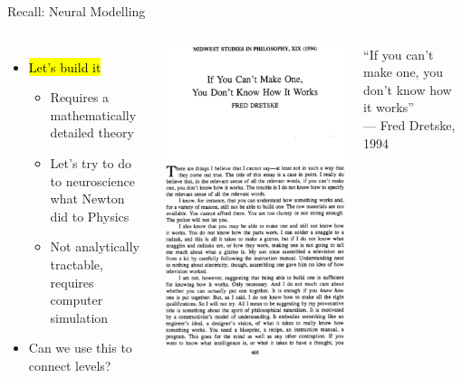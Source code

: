 \documentclass[handout,aspectratio=169]{beamer}
\begin{document}
\begin{frame}{Recall: Neural Modelling}
	\begin{overlayarea}{\textwidth}{7cm}
		\begin{columns}[c]
			\begin{itemize}
				\setlength\itemsep{0.25cm}
				\item \hl{Let's build it}\\[0.125cm]
				\begin{itemize}
					\setlength\itemsep{0.25cm}
					\item Requires a mathematically detailed theory
					\item Let's try to do to neuroscience what Newton did to Physics
					\item Not analytically tractable, requires computer simulation
				\end{itemize}
				\item Can we use this to connect levels?
			\end{itemize}
			\centering
			\includegraphics[width=0.5\columnwidth]{media/dretske_make_one.png}
			\begin{center}
				\color{aluminium4}
				\quotefont \enquote{If you can't make one, you don't know how it works} \\ --- Fred Dretske, 1994
			\end{center}
		\end{columns}
	\end{overlayarea}
\end{frame}
\end{document}
